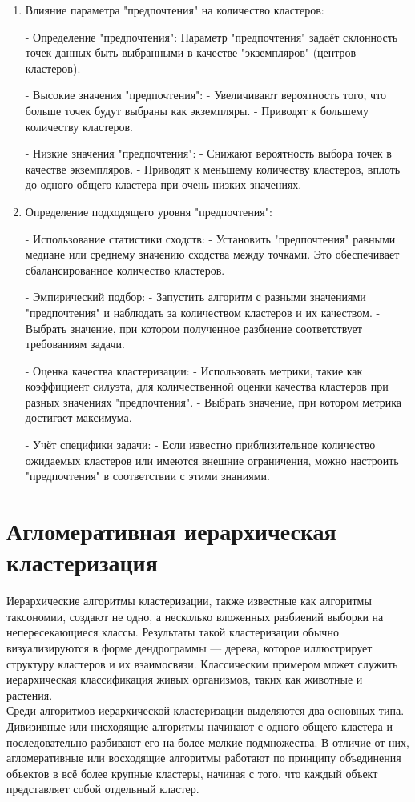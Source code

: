 \begin{enumerate}
    \item Влияние параметра "предпочтения" на количество кластеров:

- Определение "предпочтения": Параметр "предпочтения" задаёт склонность точек данных быть выбранными в качестве "экземпляров" (центров кластеров).

- Высокие значения "предпочтения":
  - Увеличивают вероятность того, что больше точек будут выбраны как экземпляры.
  - Приводят к большему количеству кластеров.

- Низкие значения "предпочтения":
  - Снижают вероятность выбора точек в качестве экземпляров.
  - Приводят к меньшему количеству кластеров, вплоть до одного общего кластера при очень низких значениях.

\item Определение подходящего уровня "предпочтения":

- Использование статистики сходств:
  - Установить "предпочтения" равными медиане или среднему значению сходства между точками. Это обеспечивает сбалансированное количество кластеров.

- Эмпирический подбор:
  - Запустить алгоритм с разными значениями "предпочтения" и наблюдать за количеством кластеров и их качеством.
  - Выбрать значение, при котором полученное разбиение соответствует требованиям задачи.

- Оценка качества кластеризации:
  - Использовать метрики, такие как коэффициент силуэта, для количественной оценки качества кластеров при разных значениях "предпочтения".
  - Выбрать значение, при котором метрика достигает максимума.

- Учёт специфики задачи:
  - Если известно приблизительное количество ожидаемых кластеров или имеются внешние ограничения, можно настроить "предпочтения" в соответствии с этими знаниями.

\end{enumerate}


\section{Агломеративная иерархическая кластеризация}
Иерархические алгоритмы кластеризации, также известные как алгоритмы таксономии, создают не одно, а несколько вложенных разбиений выборки на непересекающиеся классы. Результаты такой кластеризации обычно визуализируются в форме дендрограммы — дерева, которое иллюстрирует структуру кластеров и их взаимосвязи. Классическим примером может служить иерархическая классификация живых организмов, таких как животные и растения. \\
Среди алгоритмов иерархической кластеризации выделяются два основных типа. Дивизивные или нисходящие алгоритмы начинают с одного общего кластера и последовательно разбивают его на более мелкие подмножества. В отличие от них, агломеративные или восходящие алгоритмы работают по принципу объединения объектов в всё более крупные кластеры, начиная с того, что каждый объект представляет собой отдельный кластер.


